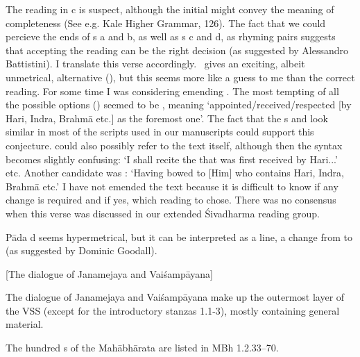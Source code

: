 { The reading  in  c is suspect, although the initial  might convey the meaning of completeness (See e.g. Kale Higher Grammar, 126). The fact that we could percieve the ends of s a and b, as well as s c and d, as rhyming pairs suggests that accepting the reading  can be the right decision (as suggested by Alessandro Battistini). I translate this verse accordingly. \msM\ gives an exciting, albeit unmetrical, alternative (), but this seems more like a guess to me than the correct reading. For some time I was considering emending . The most tempting of all the possible options  ()  seemed to be , meaning `appointed/received/respected [by Hari, Indra, Brahmā etc.] as the foremost one'. The fact that  the s  and  look similar in most of the scripts used in our manuscripts could support this conjecture.  could also possibly refer to the text itself, although then the syntax becomes slightly confusing: `I shall recite the  that was first received by Hari...' etc. Another candidate was : `Having bowed to [Him] who contains Hari, Indra, Brahmā etc.' I have not emended the text because it is difficult to know if any change is required and if yes, which reading  to chose. There was no consensus when this verse was discussed in our extended Śivadharma reading group.  

 Pāda d seems hypermetrical, but it can be interpreted as a  line, a change from  to  (as suggested by Dominic Goodall).    }




\begin{center}
{{[The dialogue of Janamejaya and Vaiśampāyana]}}
\end{center}




{ The dialogue of Janamejaya and Vaiśampāyana make up the outermost layer of the VSS                  (except for the introductory stanzas 1.1-3), mostly containing                 general  material.                 

                 The hundred s of the Mahābhārata are listed in MBh 1.2.33--70. }





